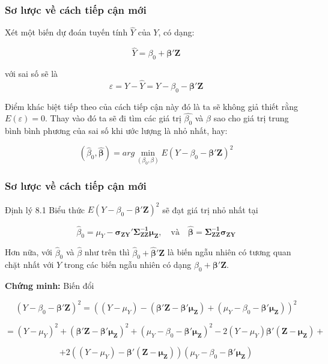\begin{frame}
\frametitle{Sơ lược về cách tiếp cận mới}

Xét một biến dự đoán tuyến tính $\widehat Y$ của $Y$, có dạng:
\begin{footnotesize}
        \[
        \widehat{Y} = \beta_0 + \boldsymbol{\beta' Z}
        \]
    \end{footnotesize}
với sai số sẽ là
\[
\widehat{\varepsilon} = Y - \widehat Y = Y - \beta_0 - \boldsymbol{\beta' Z}
\]

Điểm khác biệt tiếp theo của cách tiếp cận này đó là ta sẽ không giả thiết rằng $E(\varepsilon) = 0$.
Thay vào đó ta
sẽ đi tìm các giá trị $\widehat{\beta_0}$ và $\widehat{\beta}$ sao cho giá trị trung bình bình phương của sai số khi ước lượng là nhỏ nhất, hay:
\begin{footnotesize}
        \[
        (\hat{\beta}_0, \boldsymbol{\widehat{\beta}})= arg\min_{(\beta_0, \beta)} E (Y - \beta_0 - \boldsymbol{\beta' Z})^2
        \]
    \end{footnotesize}

\end{frame}

\begin{frame}
\frametitle{ Sơ lược về cách tiếp cận mới}
\begin{footnotesize}
    \begin{block}{Định lý 8.1}
    Biểu thức \(E(Y - \beta_0 -  \boldsymbol{\beta' Z})^2\) sẽ đạt giá trị nhỏ nhất tại

        \[
        \hat{\beta}_0 = \mu_Y - \boldsymbol{\sigma_{ZY}'\Sigma_{ZZ}^{-1} \mu_Z} , \quad \text{và} \boldsymbol{\quad \hat{\beta} = \Sigma_{ZZ}^{-1} \sigma_{ZY}}
        \]

        Hơn nữa, với \(\hat{\beta}_0\) và \(\hat{\beta}\) như trên thì \(\hat{\beta}_0 + \boldsymbol{\hat{\beta}' Z}\) là biến ngẫu nhiên có tương quan chặt nhất với $Y$ trong các biến ngẫu nhiên có dạng   \(\beta_0 + \boldsymbol{\beta' Z}\).
    \end{block}
        \textbf{Chứng minh:} Biến đổi

        \[
        (Y - \beta_0 - \boldsymbol{\beta' Z})^2 = ((Y - \mu_Y) - (\boldsymbol{\beta' Z} - \boldsymbol{\beta'\mu_Z} ) + (\mu_Y - \beta_0 - \boldsymbol{\beta'\mu_Z}))^2
        \]

        \[
        = (Y - \mu_Y)^2 + (\boldsymbol{\beta' Z} - \boldsymbol{\beta'\mu_Z})^2 + (\mu_Y - \beta_0 - \boldsymbol{\beta'\mu_Z})^2 - 2(Y - \mu_Y)\boldsymbol{\beta'( Z - \mu_Z) +}
        \]

        \[
        + 2((Y - \mu_Y)-\boldsymbol{\beta'( Z - \mu_Z)})(\mu_Y - \beta_0 - \boldsymbol{\beta'\mu_Z})
        \]

        
    \end{footnotesize}
\end{frame}

